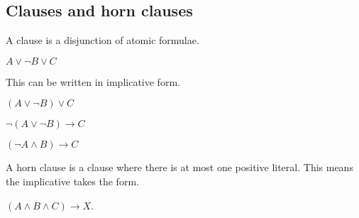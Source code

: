 \subsection{Clauses and horn clauses}

A clause is a disjunction of atomic formulae.

\(A\lor \neg B\lor C\)

This can be written in implicative form.

\((A\lor \neg B)\lor C\)

\(\neg (A\lor \neg B)\rightarrow C\)

\((\neg A\land B)\rightarrow C\)

A horn clause is a clause where there is at most one positive literal. This means the implicative takes the form.

\((A\land B\land C )\rightarrow X\).


